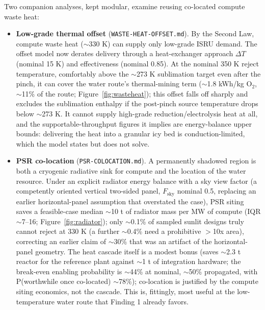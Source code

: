 \documentclass[11pt,a4paper]{article}
\begin{document}
Two companion analyses, kept modular, examine reusing co-located compute waste heat:

\begin{itemize}
  \item \textbf{Low-grade thermal offset} (\texttt{WASTE-HEAT-OFFSET.md}). By the Second
    Law, compute waste heat ($\sim$330 K) can supply only low-grade ISRU demand. The
    offset model now derates delivery through a heat-exchanger approach $\Delta T$
    (nominal 15 K) and effectiveness (nominal 0.85). At the nominal 350 K reject
    temperature, comfortably above the $\sim$273 K sublimation target even after the
    pinch, it can cover the water route's thermal-mining term ($\sim$1.8 kWh/kg O$_2$,
    $\sim$11\% of the route; Figure~\ref{fig:wasteheat}); this offset falls off sharply and
    excludes the sublimation enthalpy if the post-pinch source temperature drops below
    $\sim$273 K. It cannot supply high-grade reduction/electrolysis heat at all, and the
    supportable-throughput figures it implies are energy-balance upper bounds: delivering
    the heat into a granular icy bed is conduction-limited, which the model states but does
    not solve.

  \item \textbf{PSR co-location} (\texttt{PSR-COLOCATION.md}). A permanently shadowed
    region is both a cryogenic radiative sink for compute and the location of the water
    resource. Under an explicit radiator energy balance with a sky view factor (a
    competently oriented vertical two-sided panel, $F_{\mathrm{sky}}$ nominal 0.5,
    replacing an earlier horizontal-panel assumption that overstated the case), PSR siting
    saves a feasible-case median $\sim$10 t of radiator mass per MW of compute (IQR
    $\sim$7--16; Figure~\ref{fig:radiator}); only $\sim$0.1\% of sampled sunlit designs
    truly cannot reject at 330 K (a further $\sim$0.4\% need a prohibitive $>$10x area),
    correcting an earlier claim of $\sim$30\% that was an artifact of the horizontal-panel
    geometry. The heat cascade itself is a modest bonus (saves $\sim$2.3 t reactor for the
    reference plant against $\sim$1 t of integration hardware; the break-even enabling
    probability is $\sim$44\% at nominal, $\sim$50\% propagated, with P(worthwhile once
    co-located) $\sim$78\%); co-location is justified by the compute siting economics, not
    the cascade. This is, fittingly, most useful at the low-temperature water route that
    Finding 1 already favors.
\end{itemize}
\end{document}
